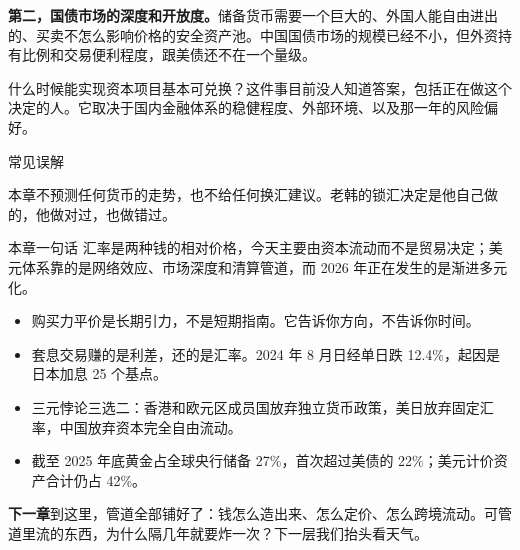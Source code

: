 \textbf{第二，国债市场的深度和开放度。}储备货币需要一个巨大的、外国人能自由进出的、买卖不怎么影响价格的安全资产池。中国国债市场的规模已经不小，但外资持有比例和交易便利程度，跟美债还不在一个量级。

什么时候能实现资本项目基本可兑换？这件事目前没人知道答案，包括正在做这个决定的人。它取决于国内金融体系的稳健程度、外部环境、以及那一年的风险偏好。

\begin{mythbox}{常见误解}
\end{mythbox}

本章不预测任何货币的走势，也不给任何换汇建议。老韩的锁汇决定是他自己做的，他做对过，也做错过。

\begin{takeaway}{本章一句话}
汇率是两种钱的相对价格，今天主要由资本流动而不是贸易决定；美元体系靠的是网络效应、市场深度和清算管道，而 2026 年正在发生的是渐进多元化。

\begin{itemize}
  \item 购买力平价是长期引力，不是短期指南。它告诉你方向，不告诉你时间。
  \item 套息交易赚的是利差，还的是汇率。2024 年 8 月日经单日跌 12.4\%，起因是日本加息 25 个基点。
  \item 三元悖论三选二：香港和欧元区成员国放弃独立货币政策，美日放弃固定汇率，中国放弃资本完全自由流动。
  \item 截至 2025 年底黄金占全球央行储备 27\%，首次超过美债的 22\%；美元计价资产合计仍占 42\%。
\end{itemize}

\end{takeaway}

\begin{bridgebox}
\textbf{下一章}到这里，管道全部铺好了：钱怎么造出来、怎么定价、怎么跨境流动。可管道里流的东西，为什么隔几年就要炸一次？下一层我们抬头看天气。
\end{bridgebox}

